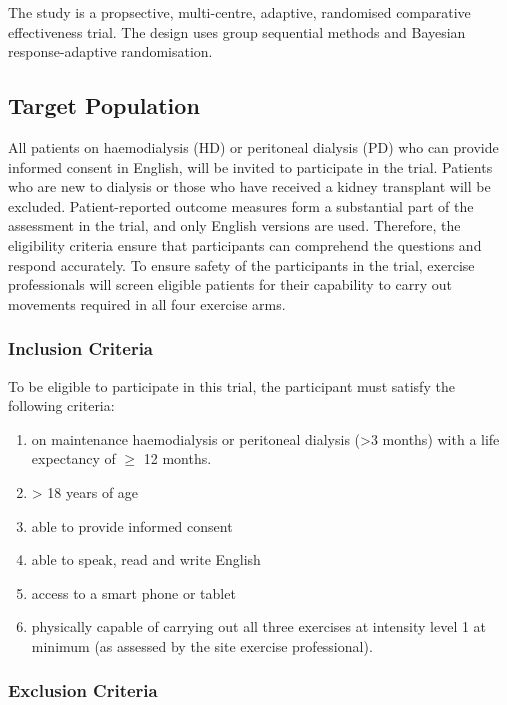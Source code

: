 \documentclass[11pt,parskip=half-]{scrartcl}
\providecommand{\tightlist}{%
  \setlength{\itemsep}{0pt}\setlength{\parskip}{0pt}}
\begin{document}
The study is a propsective, multi-centre, adaptive, randomised comparative effectiveness trial. The design uses group sequential methods and Bayesian response-adaptive randomisation.

\subsection{Target Population}\label{target-population}

All patients on haemodialysis (HD) or peritoneal dialysis (PD) who can provide informed consent in English, will be invited to participate in the trial. Patients who are new to dialysis or those who have received a kidney transplant will be excluded. Patient-reported outcome measures form a substantial part of the assessment in the trial, and only English versions are used. Therefore, the eligibility criteria ensure that participants can comprehend the questions and respond accurately. To ensure safety of the participants in the trial, exercise professionals will screen eligible patients for their capability to carry out movements required in all four exercise arms.

\subsubsection{Inclusion Criteria}\label{inclusion-criteria}

To be eligible to participate in this trial, the participant must satisfy the following criteria:

\begin{enumerate}
  \def\labelenumi{\arabic{enumi}.}
  \tightlist
  \item on maintenance haemodialysis or peritoneal dialysis (>3 months) with a life expectancy of $\ge$ 12 months.
  \item > 18 years of age
  \item able to provide informed consent
  \item able to speak, read and write English
  \item access to a smart phone or tablet
  \item physically capable of carrying out all three exercises at intensity level 1 at minimum (as assessed by the site exercise professional).
\end{enumerate}

\subsubsection{Exclusion Criteria}\label{exclusion-criteria}
\end{document}
